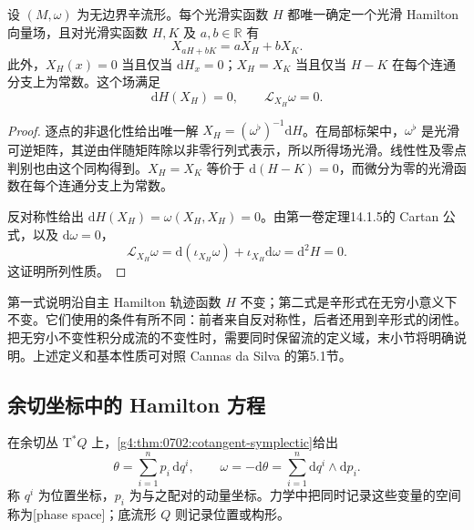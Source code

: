 \begin{proposition}\label{g4:prop:0901:basic-properties}
	设 \((M,\omega)\) 为无边界辛流形。每个光滑实函数 \(H\) 都唯一确定一个光滑 Hamilton 向量场，且对光滑实函数 \(H,K\) 及 \(a,b\in\mathbb R\) 有
	\[
		X_{aH+bK}=aX_H+bX_K.
	\]
	此外，\(X_H(x)=0\) 当且仅当 \(\mathrm{d}H_x=0\)；\(X_H=X_K\) 当且仅当 \(H-K\) 在每个连通分支上为常数。这个场满足
	\begin{equation}\label{g4:eq:0901:hamiltonian-invariance}
		\mathrm{d}H(X_H)=0,
		\qquad \mathcal L_{X_H}\omega=0.
	\end{equation}
\end{proposition}
\begin{proof}
	逐点的非退化性给出唯一解 \(X_H=(\omega^\flat)^{-1}\mathrm{d}H\)。在局部标架中，\(\omega^\flat\) 是光滑可逆矩阵，其逆由伴随矩阵除以非零行列式表示，所以所得场光滑。线性性及零点判别也由这个同构得到。\(X_H=X_K\) 等价于 \(\mathrm{d}(H-K)=0\)，而微分为零的光滑函数在每个连通分支上为常数。

	反对称性给出 \(\mathrm{d}H(X_H)=\omega(X_H,X_H)=0\)。由第一卷定理14.1.5的 Cartan 公式，以及 \(\mathrm{d}\omega=0\)，
	\[
		\mathcal L_{X_H}\omega
		=\mathrm{d}(\iota_{X_H}\omega)+\iota_{X_H}\mathrm{d}\omega
		=\mathrm{d}^2H=0.
	\]
	这证明所列性质。
\end{proof}

第一式说明沿自主 Hamilton 轨迹函数 \(H\) 不变；第二式是辛形式在无穷小意义下不变。它们使用的条件有所不同：前者来自反对称性，后者还用到辛形式的闭性。把无穷小不变性积分成流的不变性时，需要同时保留流的定义域，末小节将明确说明。上述定义和基本性质可对照 Cannas da Silva 的第5.1节。\cite[第139--140页]{Cannas2006Symplectic}

\subsection{余切坐标中的 Hamilton 方程}
\label{g4:subsec:0901:02}

在余切丛 \(\mathrm{T}^*Q\) 上，\cref{g4:thm:0702:cotangent-symplectic}给出
\[
	\theta=\sum_{i=1}^n p_i\,\mathrm{d}q^i,
	\qquad \omega=-\mathrm{d}\theta
	=\sum_{i=1}^n\mathrm{d}q^i\wedge\mathrm{d}p_i.
\]
称 \(q^i\) 为位置坐标，\(p_i\) 为与之配对的动量坐标。力学中把同时记录这些变量的空间称为[phase space]；底流形 \(Q\) 则记录位置或构形。

